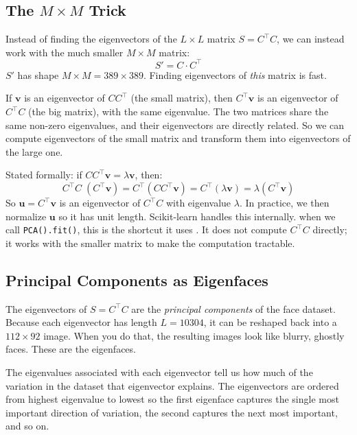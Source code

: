 \documentclass[12pt,a4paper]{article}
\begin{document}
\newpage
\enlargethispage{2\baselineskip}
\subsection{The \texorpdfstring{$M \times M$}{M x M} Trick}

Instead of finding the eigenvectors of the $L \times L$ matrix $S = C^{\top}C$,
we can instead work with the much smaller $M \times M$ matrix:
\[
S' = C \cdot C^{\top}
\]
$S'$ has shape $M \times M = 389 \times 389$. Finding eigenvectors of
\emph{this} matrix is fast.

If $\mathbf{v}$ is an eigenvector of $C C^{\top}$ (the small matrix), then $C^{\top} \mathbf{v}$ is an eigenvector of $C^{\top} C$ (the big matrix), with the same eigenvalue. The two matrices share the same non-zero eigenvalues, and their eigenvectors are directly related. So we can compute eigenvectors of the small matrix and transform them into eigenvectors of the large one.

Stated formally: if $C C^{\top} \mathbf{v} = \lambda \mathbf{v}$, then:
\[
C^{\top} C \; (C^{\top} \mathbf{v}) = C^{\top}(C C^{\top} \mathbf{v}) = C^{\top}(\lambda \mathbf{v}) = \lambda (C^{\top} \mathbf{v})
\]
So $\mathbf{u} = C^{\top} \mathbf{v}$ is an eigenvector of $C^{\top}C$ with
eigenvalue $\lambda$. In practice, we then normalize $\mathbf{u}$ so it has
unit length. Scikit-learn handles this internally. when we call
\texttt{PCA().fit()}, this is the shortcut it uses . It does not
compute $C^{\top}C$ directly; it works with the smaller matrix to make the
computation tractable.

\subsection{Principal Components as Eigenfaces}

The eigenvectors of $S = C^{\top}C$ are the \emph{principal components} of the
face dataset. Because each eigenvector has length $L = 10304$, it can be
reshaped back into a $112 \times 92$ image. When you do that, the resulting
images look like blurry, ghostly faces. These are the eigenfaces.

The eigenvalues associated with each eigenvector tell us how much of the
variation in the dataset that eigenvector explains. The eigenvectors are ordered
from highest eigenvalue to lowest so the first eigenface captures the
single most important direction of variation, the second captures the next
most important, and so on.
\end{document}
